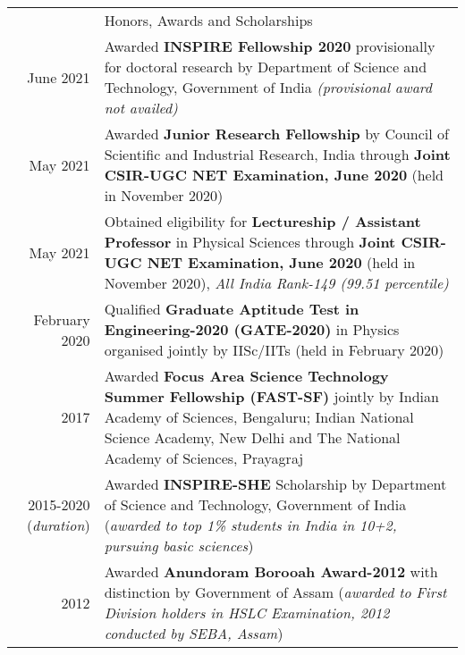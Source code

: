 \documentclass[a4paper, 11pt]{article}
\newcommand{\headingfont}{\Large\color{Bittersweet}}
\newenvironment{SectionTable}[1]{
	\renewcommand*{\arraystretch}{1.7}
	\setlength{\tabcolsep}{10pt}
	\begin{longtable}{Rp{5.2in}} & #1 \\}
{\end{longtable}\vspace{-.3cm}}
\begin{document}









\begin{SectionTable}{\headingfont Honors, Awards and Scholarships}
June 2021 & 
Awarded \textbf{INSPIRE Fellowship 2020} provisionally for doctoral research by Department of Science and Technology, Government of India \textit{(provisional award not availed)}
 \\

May 2021 &
Awarded \textbf{Junior Research Fellowship} by Council of Scientific and
Industrial Research, India through \textbf{Joint CSIR-UGC NET Examination, June 2020}
(held in November 2020) \\ %

May 2021 &
Obtained eligibility for \textbf{Lectureship / Assistant Professor} in Physical Sciences through \textbf{Joint CSIR-UGC NET Examination, June 2020}
(held in November 2020), \textit{All India Rank-149 (99.51 percentile)} \\

February 2020 &
Qualified \textbf{Graduate Aptitude Test in Engineering-2020 (GATE-2020)} in Physics organised jointly by IISc/IITs (held in February 2020) \\

2017 &
Awarded \textbf{Focus Area Science Technology Summer Fellowship (FAST-SF)} jointly by Indian Academy of Sciences, Bengaluru; Indian National Science Academy, New Delhi and The National Academy of Sciences, Prayagraj \\

2015-2020 (\textit{duration})&
Awarded \textbf{INSPIRE-SHE} Scholarship by Department of Science and Technology, Government of India (\textit{awarded to top 1\% students in India in 10+2, pursuing basic sciences}) \\

2012 &
Awarded \textbf{Anundoram Borooah Award-2012} with distinction by Government of Assam (\textit{awarded to First Division holders in HSLC Examination, 2012 conducted by SEBA, Assam})

\end{SectionTable}
\end{document}
